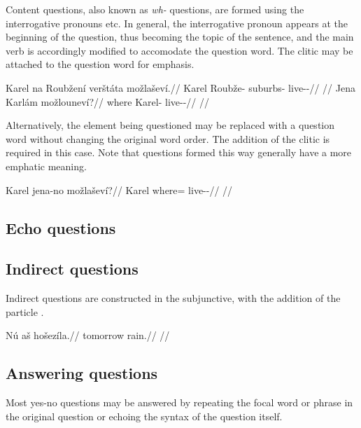 Content questions, also known as \emph{wh-} questions, are formed using the interrogative pronouns    etc. In general, the interrogative pronoun appears at the beginning of the question, thus becoming the topic of the sentence, and the main verb is accordingly modified to accomodate the question word. The clitic  may be attached to the question word for emphasis.

\pex
\a\begingl
\gla Karel na Roub\v{z}en\'i ver\v{s}t\'ata mo\v{z}la\v{s}ev\'i.//
\glb Karel \Loc{} Roub\v{z}e-\Gen{} suburbs-\Pat{} live-\Av{}-\Cont{}//
\glft {}//
\endgl
\a\begingl
\gla Jena Karl\'am mo\v{z}lounev\'i?//
\glb where Karel-\Agt{} live-\Loc{}-\Cont{}//
\glft {}//
\endgl
\xe

Alternatively, the element being questioned may be replaced with a question word without changing the original word order. The addition of the clitic  is required in this case. Note that questions formed this way generally have a more emphatic meaning.

\pex
\begingl
\gla Karel jena-no mo\v{z}la\v{s}ev\'i?//
\glb Karel where=\Q{} live-\Av{}-\Cont{}//
\glft {}//
\endgl
\xe


\subsection{Echo questions}
\subsection{Indirect questions}

Indirect questions are constructed in the subjunctive, with the addition of the particle .

\pex
\begingl
\gla Nú aš hošezíla.//
\glb tomorrow  rain.//
\glft {}//
\endgl
\xe

\subsection{Answering questions}\label{sec:ansyn}

Most yes-no questions may be answered by repeating the focal word or phrase in the original question or echoing the syntax of the question itself.

\ex
{}
\xe


